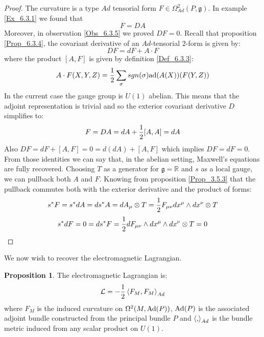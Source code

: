 \documentclass[12pt,a4paper]{report}
\theoremstyle{definition}
\theoremstyle{Theorem}
\newtheorem{Prop}[Def]{Proposition}
\theoremstyle{definition}
\theoremstyle{definition}
\begin{document}
	\begin{proof}
		The curvature is a type $Ad$ tensorial form $F\in \Omega^2_{Ad}(P,\mathfrak{g})$. In example \ref{Ex_6.3.1} we found that
		$$F=DA$$
		Moreover, in observation \ref{Obs_6.3.5} we proved $DF=0$. Recall that proposition \ref{Prop_6.3.4}, the covariant derivative of an $Ad$-tensorial $2$-form is given by:
		$$DF=dF+A\cdot F$$
		where the product $[A,F]$ is given by definition \ref{Def_6.3.3}:
		$$A\cdot F(X,Y,Z)={1\over 2}\sum_\sigma sgn(\sigma)\hbox{ad}(A(X))(F(Y,Z))$$
		In the current case the gauge group is $U(1)$ abelian. This means that the adjoint representation is trivial and so the exterior covariant derivative $D$ simplifies to:
		$$F=DA=dA+{1\over 2}[A,A]=dA$$
		Also $DF=dF+[A,F]=0=d(dA)+[A,F]$ which implies $DF=dF=0$. From those identities we can say that, in the abelian setting, Maxwell's equations are fully recovered. Choosing $T$ as a generator for $\mathfrak{g}=\mathbb{R}$ and $s$ as a local gauge, we can pullback both $A$ and $F$. Knowing from proposition \ref{Prop_3.5.3} that the pullback commutes both with the exterior derivative and the product of forms:
		$$s^*F=s^*dA=ds^*A=dA_\mu\otimes T={1\over 2}F_{\mu\nu} dx^\mu\wedge dx^\nu \otimes T$$
		$$s^*dF=0=ds^*F={1\over 2}dF_{\mu\nu}\wedge dx^\mu\wedge dx^\nu \otimes T=0$$
	\end{proof}
	We now wish to recover the electromagnetic Lagrangian.
	\begin{Prop}
		The electromagnetic Lagrangian is:
		$$\mathcal{L}=-{1\over 2}\braket{F_M,F_M}_{Ad}$$
		where $F_M$ is the induced curvature on $\Omega^2(M,\hbox{Ad}(P))$, $\hbox{Ad}(P)$ is the associated adjoint bundle constructed from the principal bundle $P$ and $\braket{,}_{Ad}$ is the bundle metric induced from any scalar product on $U(1)$.
	\end{Prop}
\end{document}
